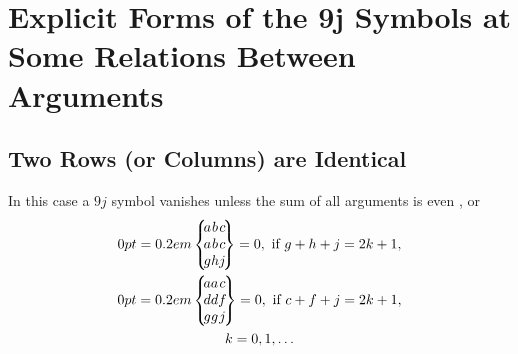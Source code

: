 \section{Explicit Forms of the 9j Symbols at Some Relations Between Arguments}\label{sec:10.8}
\subsection{Two Rows (or Columns) are Identical}\label{sec:10.8.1}
In this case a $9 j$ symbol vanishes unless the sum of all arguments is even \cite{ref049}, or
\begin{gather}
\ninej{a}{b}{c}{a}{b}{c}{g}{h}{j}=0, \text { if } g+h+j=2 k+1,  \notag\\
\ninej{a}{a}{c}{d}{d}{f}{g}{g}{j}=0, \text { if } c+f+j=2 k+1,  \label{eq:10:8:1}\\
k=0,1, \ldots \notag
\end{gather}
